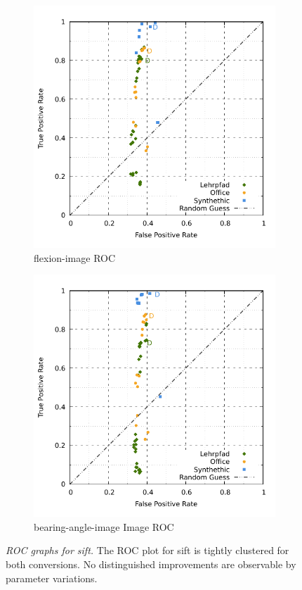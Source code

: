 \begin{figure}[H]
\begin{subfigure}[t]{0.45\linewidth}
    \includegraphics[width=\linewidth]{chapter06/results/SIFT/flexion/roc.pdf}%
    \caption{\gls{flexion-image} ROC}
\end{subfigure}\quad
\begin{subfigure}[t]{0.45\linewidth}
    \includegraphics[width=\linewidth]{chapter06/results/SIFT/bearing/roc.pdf}
    \caption{\gls{bearing-angle-image} Image ROC}
\end{subfigure}
    \caption[\acrshort{ROC} graphs for \acrshort{sift}]{\emph{\acrshort{ROC} graphs for \acrshort{sift}.} The ROC plot for \acrshort{sift} is tightly clustered for both conversions. No distinguished improvements are observable by parameter variations.}\label{fig:roc_sift}
\end{figure}

